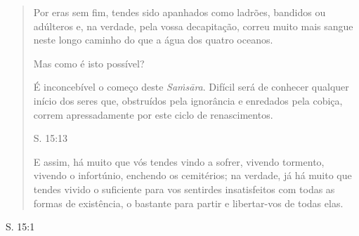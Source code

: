 \begin{quote}
Por eras sem fim, tendes sido apanhados como ladrões, bandidos ou adúlteros e, na verdade, pela vossa decapitação, correu muito mais sangue neste longo caminho do que a água dos quatro oceanos.

Mas como é isto possível?

É inconcebível o começo deste \emph{Saṁsāra}. Difícil será de conhecer qualquer início dos seres que, obstruídos pela ignorância e enredados pela cobiça, correm apressadamente por este ciclo de renascimentos.

S. 15:13

E assim, há muito que vós tendes vindo a sofrer, vivendo tormento, vivendo o infortúnio, enchendo os cemitérios; na verdade, já há muito que tendes vivido o suficiente para vos sentirdes insatisfeitos com todas as formas de existência, o bastante para partir e libertar-vos de todas elas.
\end{quote}

S. 15:1
